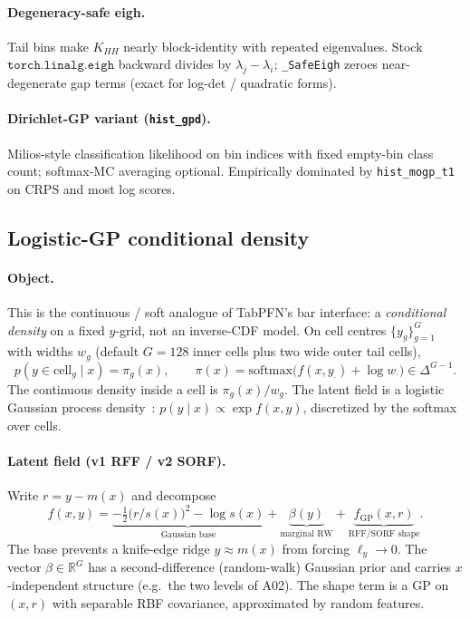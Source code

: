 \documentclass[11pt,a4paper]{article}
\theoremstyle{definition}
\newcommand{\R}{\mathbb{R}}
\begin{document}
\paragraph{Degeneracy-safe eigh.}
Tail bins make $K_{HH}$ nearly block-identity with repeated eigenvalues.
Stock $\texttt{torch.linalg.eigh}$ backward divides by $\lambda_j-\lambda_i$;
\texttt{\_SafeEigh} zeroes near-degenerate gap terms (exact for log-det /
quadratic forms).

\paragraph{Dirichlet-GP variant (\texttt{hist\_gpd}).}
Milios-style classification likelihood on bin indices with fixed empty-bin
class count; softmax-MC averaging optional. Empirically dominated by
\texttt{hist\_mogp\_t1} on CRPS and most log scores.

\subsection{Logistic-GP conditional density}
\label{sec:logistic}

\paragraph{Object.}
This is the continuous / soft analogue of TabPFN's bar interface: a
\emph{conditional density} on a fixed $y$-grid, not an inverse-CDF model.
On cell centres $\{y_g\}_{g=1}^{G}$ with widths $w_g$ (default $G{=}128$ inner
cells plus two wide outer tail cells),
\begin{equation}
  p(y\in\mathrm{cell}_g\mid x)
  =
  \pi_g(x),
  \qquad
  \pi(x)=\mathrm{softmax}\bigl(f(x,y_\cdot)+\log w_\cdot\bigr)\in\Delta^{G-1}.
\end{equation}
The continuous density inside a cell is $\pi_g(x)/w_g$. The latent field is a
logistic Gaussian process density~\cite{tokdar2010}:
$p(y\mid x)\propto\exp f(x,y)$, discretized by the softmax over cells.

\paragraph{Latent field (v1 RFF / v2 SORF).}
Write $r=y-m(x)$ and decompose
\begin{equation}
  f(x,y)
  =
  \underbrace{-\tfrac12\bigl(r/s(x)\bigr)^2-\log s(x)}_{\text{Gaussian base}}
  +
  \underbrace{\beta(y)}_{\text{marginal RW}}
  +
  \underbrace{f_{\mathrm{GP}}(x,r)}_{\text{RFF/SORF shape}}.
\end{equation}
The base prevents a knife-edge ridge $y\approx m(x)$ from forcing
$\ell_y\to 0$. The vector $\beta\in\R^G$ has a second-difference
(random-walk) Gaussian prior and carries $x$-independent structure (e.g.\ the
two levels of A02). The shape term is a GP on $(x,r)$ with separable RBF
covariance, approximated by random features.
\end{document}
